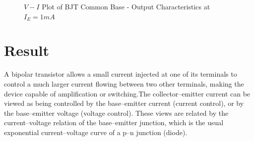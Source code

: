 			\begin{figure}[h]
				\centering
				\caption{$V - I$ Plot of BJT Common Base - Output Characteristics at $I_E = 1 mA$}
			\end{figure}
	
	\section{Result}
		A bipolar transistor allows a small current injected at one of its terminals to control a much larger current flowing between two other terminals, making the device capable of amplification or switching.The collector–emitter current can be viewed as being controlled by the base–emitter current (current control), or by the base–emitter voltage (voltage control). These views are related by the current–voltage relation of the base–emitter junction, which is the usual exponential current–voltage curve of a p–n junction (diode).